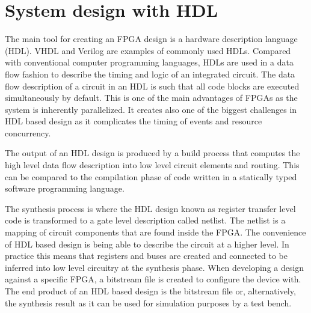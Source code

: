 \documentclass[12pt]{report}
\begin{document}
\section{System design with HDL}
The main tool for creating an FPGA design is a hardware description language (HDL). VHDL and Verilog are examples of commonly used HDLs. Compared with conventional computer programming languages, HDLs are used in a data flow fashion to describe the timing and logic of an integrated circuit. The data flow description of a circuit in an HDL is such that all code blocks are executed simultaneously by default. This is one of the main advantages of FPGAs as the system is inherently parallelized. It creates also one of the biggest challenges in HDL based design as it complicates the timing of events and resource concurrency.
\par
The output of an HDL design is produced by a build process that computes the high level data flow description into low level circuit elements and routing. This can be compared to the compilation phase of code written in a statically typed software programming language. 
\par
The synthesis process is where the HDL design known as register transfer level code is transformed to a gate level description called netlist. The netlist is a mapping of circuit components that are found inside the FPGA. The convenience of HDL based design is being able to describe the circuit at a higher level. In practice this means that registers and buses are created and connected to be inferred into low level circuitry at the synthesis phase. When developing a design against a specific FPGA, a bitstream file is created to configure the device with. The end product of an HDL based design is the bitstream file or, alternatively, the synthesis result as it can be used for simulation purposes by a test bench. \citep{XilVivado}
\end{document}
